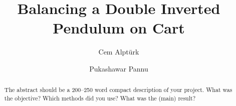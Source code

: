 \documentclass{LTHtwocol} %
\begin{document}
\begin{frontmatter}
\title{Balancing a Double Inverted Pendulum on Cart} %

\author[cem]{Cem Alpt\"urk}
\author[pukashawar]{Pukashawar Pannu}


\begin{abstract}
    The abstract should be a 200--250 word compact description of your project. What was the objective? Which methods did you use? What was the (main) result?
\end{abstract}

\end{frontmatter}

\end{document}
